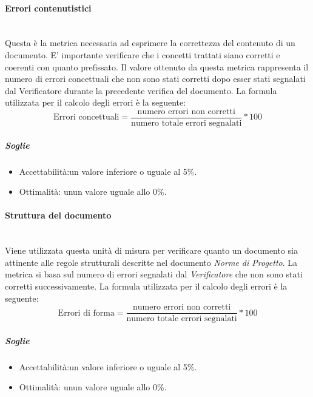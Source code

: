 \paragraph{Errori contenutistici}
\label{AppB:ErroriCont}
	~\\Questa è la metrica necessaria ad esprimere la correttezza del contenuto di un documento. E' importante verificare che i concetti trattati siano corretti e coerenti con quanto prefissato. Il valore ottenuto da questa metrica rappresenta il numero di errori concettuali che non sono stati corretti dopo esser stati segnalati dal {Verificatore} durante la precedente verifica del documento.
\newline La formula utilizzata per il calcolo degli errori è la seguente:
\begin{displaymath}
\mbox{Errori concettuali}=\frac{\mbox{numero errori non corretti}}{\mbox{numero totale errori segnalati}}*100
\end{displaymath}

\subparagraph{Soglie}
\begin{itemize}
\item Accettabilità:un valore inferiore o uguale al 5\%.
\item Ottimalità: unun valore uguale allo 0\%.
\end{itemize}

\paragraph{Struttura del documento}
\label{AppB:ErroriForma}
	~\\Viene utilizzata questa unità di misura per verificare quanto un documento sia attinente alle regole strutturali descritte nel documento \textit{Norme di Progetto}.
La metrica si basa sul numero di errori segnalati dal \textit{Verificatore} che non sono stati corretti successivamente.
\newline La formula utilizzata per il calcolo degli errori è la seguente:
\begin{displaymath}
\mbox{Errori di forma}=\frac{\mbox{numero errori non corretti}}{\mbox{numero totale errori segnalati}}*100
\end{displaymath}

\subparagraph{Soglie}
\begin{itemize}
\item Accettabilità:un valore inferiore o uguale al 5\%.
\item Ottimalità: unun valore uguale allo 0\%.
\end{itemize}

